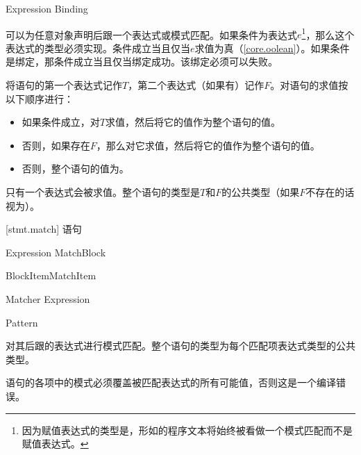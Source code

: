 \begin{bnf}
 \br
    Expression \br
    Binding
\end{bnf}

\pnum
{}可以为任意对象声明后跟一个表达式或模式匹配。如果条件为表达式$e$\footnote{因为赋值表达式的类型是，形如的程序文本将始终被看做一个模式匹配而不是赋值表达式。}，那么这个表达式的类型必须实现。条件成立当且仅当$e$求值为真（\ref{core.oolean}）。如果条件是绑定，那条件成立当且仅当绑定成功。该绑定必须可以失败。

\pnum
将语句的第一个表达式记作$T$，第二个表达式（如果有）记作$F$。对语句的求值按以下顺序进行：

\begin{itemize}

\item 如果条件成立，对$T$求值，然后将它的值作为整个语句的值。
\item 否则，如果存在$F$，那么对它求值，然后将它的值作为整个语句的值。
\item 否则，整个语句的值为\tcode{()}。

\end{itemize}

只有一个表达式会被求值。整个语句的类型是$T$和$F$的公共类型（如果$F$不存在的话视为）。

[stmt.match]{ 语句}

\begin{bnf}
 \br
     Expression MatchBlock
\end{bnf}

\begin{bnf}
 \br
    \terminal{\{} BlockItem\bnfs MatchItem\bnfs \terminal{\}}
\end{bnf}

\begin{bnf}
 \br
    Matcher Expression\bnfp
\end{bnf}

\begin{bnf}
 \br
    Pattern \terminal{->}
\end{bnf}

\pnum
{}对其后跟的表达式进行模式匹配。整个语句的类型为每个匹配项表达式类型的公共类型。

\pnum
{}语句的各项中的模式必须覆盖被匹配表达式的所有可能值，否则这是一个编译错误。

